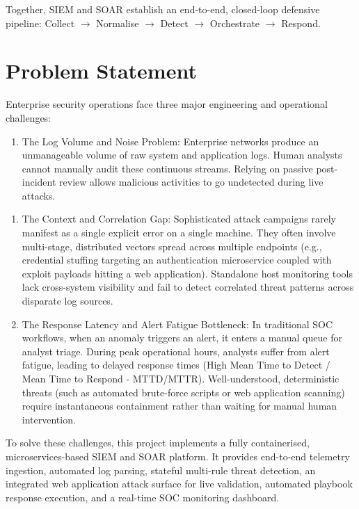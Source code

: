 Together, SIEM and SOAR establish an end-to-end, closed-loop defensive pipeline: Collect $\rightarrow$ Normalise $\rightarrow$ Detect $\rightarrow$ Orchestrate $\rightarrow$ Respond.

\section{Problem Statement}

Enterprise security operations face three major engineering and operational challenges:

\begin{enumerate}
  \item The Log Volume and Noise Problem: Enterprise networks produce an unmanageable volume of raw system and application logs. Human analysts cannot manually audit these continuous streams. Relying on passive post-incident review allows malicious activities to go undetected during live attacks.
\end{enumerate}

\begin{enumerate}
  \item The Context and Correlation Gap: Sophisticated attack campaigns rarely manifest as a single explicit error on a single machine. They often involve multi-stage, distributed vectors spread across multiple endpoints (e.g., credential stuffing targeting an authentication microservice coupled with exploit payloads hitting a web application). Standalone host monitoring tools lack cross-system visibility and fail to detect correlated threat patterns across disparate log sources.
  \item The Response Latency and Alert Fatigue Bottleneck: In traditional SOC workflows, when an anomaly triggers an alert, it enters a manual queue for analyst triage. During peak operational hours, analysts suffer from alert fatigue, leading to delayed response times (High Mean Time to Detect / Mean Time to Respond - MTTD/MTTR). Well-understood, deterministic threats (such as automated brute-force scripts or web application scanning) require instantaneous containment rather than waiting for manual human intervention.
\end{enumerate}

To solve these challenges, this project implements a fully containerised, microservices-based SIEM and SOAR platform. It provides end-to-end telemetry ingestion, automated log parsing, stateful multi-rule threat detection, an integrated web application attack surface for live validation, automated playbook response execution, and a real-time SOC monitoring dashboard.

